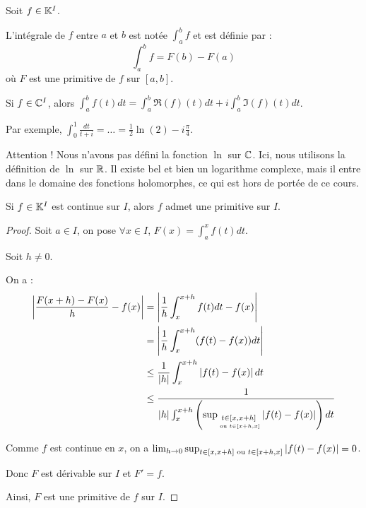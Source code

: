 \documentclass[12pt, a4paper]{report}
\begin{document}
\begin{definition}
    Soit $f\in\mathbb{K}^I$.

    L'intégrale de $f$ entre $a$ et $b$ est notée $\int_a^b f$ et est définie par :
    $$\int_a^b f = F(b) - F(a)$$
    où $F$ est une primitive de $f$ sur $[a,b]$.
\end{definition}

\begin{remark}
    Si $f \in \mathbb{C}^I$, alors $\int_a^b f(t)dt = \int_a^b\Re(f)(t)dt + i\int_a^b \Im(f)(t)dt$.

    Par exemple, $\int_0^1 \frac{dt}{t+i} = \dots = \frac12 \ln(2) - i\frac{\pi}{4}$.

    Attention ! Nous n'avons pas défini la fonction $\ln$ sur $\mathbb{C}$. Ici, nous utilisons la définition de $\ln$ sur $\mathbb{R}$. Il existe bel et bien un logarithme complexe, mais il entre dans le domaine des fonctions holomorphes, ce qui est hors de portée de ce cours.
\end{remark}

\begin{theorem}
    Si $f \in \mathbb{K}^I$ est continue sur $I$, alors $f$ admet une primitive sur $I$.
\end{theorem}

\begin{proof}
    Soit $a \in I$, on pose $\forall x \in I$, $F(x) = \int_a^x f(t) dt$.

    Soit $h \ne 0$.

    On a :
    \begin{align*}
        \left|\frac{F(x+h)-F(x)}{h} - f(x)\right| &= \left|\frac{1}{h} \int_x^{x+h} f(t) dt - f(x)\right| \\
        &= \left|\frac{1}{h} \int_x^{x+h} (f(t) - f(x)) dt\right| \\
        &\le \frac{1}{\left|h\right|} \int_x^{x+h} \left|f(t) - f(x)\right| dt\\
        &\le \frac{1}{\left|h\right| \int_x^{x+h} \left(\sup_{\underset{\text{ ou } t\in[x+h,x]}{t\in[x,x+h]}} \left|f(t) - f(x)\right|\right) dt} \\
    \end{align*}

    Comme $f$ est continue en $x$, on a $\lim_{h\to 0} \sup_{t\in[x,x+h]\text{ ou } t\in[x+h,x]} \left|f(t) - f(x)\right| = 0$.

    Donc $F$ est dérivable sur $I$ et $F' = f$.

    Ainsi, $F$ est une primitive de $f$ sur $I$.
\end{proof}
\end{document}
